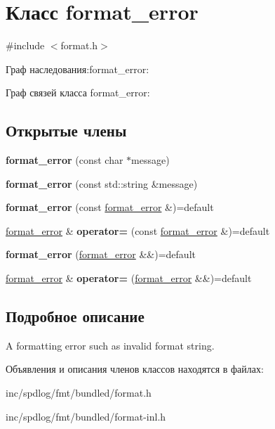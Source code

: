 \hypertarget{classformat__error}{}\section{Класс format\+\_\+error}
\label{classformat__error}


{\ttfamily \#include $<$format.\+h$>$}



Граф наследования\+:format\+\_\+error\+:


Граф связей класса format\+\_\+error\+:
\subsection*{Открытые члены}
\begin{DoxyCompactItemize}
\item 
\mbox{\label{classformat__error_adfdc5b92749dc5f436e456bb5393d689}} 
{\bfseries format\+\_\+error} (const char $\ast$message)
\item 
\mbox{\label{classformat__error_aec9d9c4e34320e130463abaf4dc4f200}} 
{\bfseries format\+\_\+error} (const std\+::string \&message)
\item 
\mbox{\label{classformat__error_a84a6f4f0767a992d55342c82ea9caf49}} 
{\bfseries format\+\_\+error} (const \hyperlink{classformat__error}{format\+\_\+error} \&)=default
\item 
\mbox{\label{classformat__error_ad767e00900be7423ea065fab6c6771a4}} 
\hyperlink{classformat__error}{format\+\_\+error} \& {\bfseries operator=} (const \hyperlink{classformat__error}{format\+\_\+error} \&)=default
\item 
\mbox{\label{classformat__error_ac0509867f7d8237c005654426b9ebe3e}} 
{\bfseries format\+\_\+error} (\hyperlink{classformat__error}{format\+\_\+error} \&\&)=default
\item 
\mbox{\label{classformat__error_a37c22ec38899779b83aceb9dc7e81c11}} 
\hyperlink{classformat__error}{format\+\_\+error} \& {\bfseries operator=} (\hyperlink{classformat__error}{format\+\_\+error} \&\&)=default
\end{DoxyCompactItemize}


\subsection{Подробное описание}
A formatting error such as invalid format string. 

Объявления и описания членов классов находятся в файлах\+:\begin{DoxyCompactItemize}
\item 
inc/spdlog/fmt/bundled/format.\+h\item 
inc/spdlog/fmt/bundled/format-\/inl.\+h\end{DoxyCompactItemize}
